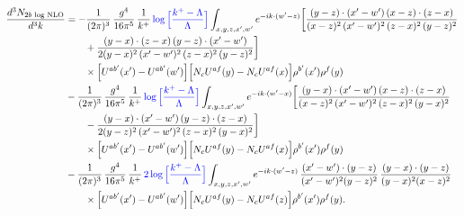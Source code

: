 \documentclass[10pt]{article}
\numberwithin{equation}{section}
\begin{document}
\begin{align}
\frac{d^{3}N_{2b\,\log\,\rm NLO}}{d^{3}k}&=-\frac{1}{(2\pi)^{3}}\,\frac{g^{4}}{16\pi^{5}}\,\frac{1}{k^{+}}\,{\color{blue}\log\Big[\frac{k^{+}-\Lambda}{\Lambda}\Big]}\int_{x,y,z,x',w'}e^{-ik\cdot(w'-z)}\bigg[\frac{(y-z)\cdot (x'-w')\,(x-z)\cdot (z-x)}{(x-z)^{2}\,(x'-w')^{2}\,(z-x)^{2}\,(y-z)^{2}}\notag\\
&\qquad+\frac{(y-x)\cdot (z-x)\,(y-z)\cdot (x'-w')}{2(y-x)^{2}\,(x'-w')^{2}\,(z-x)^{2}\,(y-z)^{2}}\bigg]\notag\\&\qquad\times\Big[U^{ab'}(x')-U^{ab'}(w')\Big]\Big[N_{c}U^{af}(y)-N_{c}U^{af}(x)\Big]\rho^{b'}(x')\rho^{f}(y)\notag\\
&-\frac{1}{(2\pi)^{3}}\,\frac{g^{4}}{16\pi^{5}}\,\frac{1}{k^{+}}\,{\color{blue}\log\Big[\frac{k^{+}-\Lambda}{\Lambda}\Big]}\int_{x,y,z,x',w'}e^{-ik\cdot(w'-x)}\bigg[\frac{(y-x)\cdot (x'-w')\,(x-z)\cdot (z-x)}{(x-z)^{2}\,(x'-w')^{2}\,(z-x)^{2}\,(y-x)^{2}}\notag\\
&\qquad-\frac{(y-x)\cdot (x'-w')\,(y-z)\cdot (z-x)}{2(y-z)^{2}\,(x'-w')^{2}\,(z-x)^{2}\,(y-x)^{2}}\bigg]\notag\\&\qquad\times\Big[U^{ab'}(x')-U^{ab'}(w')\Big]\Big[N_{c}U^{af}(y)-N_{c}U^{af}(x)\Big]\rho^{b'}(x')\rho^{f}(y)\notag\\
&-\frac{1}{(2\pi)^{3}}\,\frac{g^{4}}{16\pi^{5}}\,\frac{1}{k^{+}}\,{\color{blue}2\log\Big[\frac{k^{+}-\Lambda}{\Lambda}\Big]}\int_{x,y,z,x',w'}e^{-ik\cdot(w'-z)}\,\frac{(x'-w')\cdot(y-z)}{(x'-w')^{2}(y-z)^{2}}\,\frac{(y-x)\cdot(y-z)}{(y-x)^{2}(x-z)^{2}}\notag\\
&\qquad\times\Big[U^{ab'}(x')-U^{ab'}(w')\Big]\Big[N_{c}U^{af}(y)-N_{c}U^{af}(z)\Big]\rho^{b'}(x')\rho^{f}(y).
\label{eq:N2blog}
\end{align}
\end{document}
